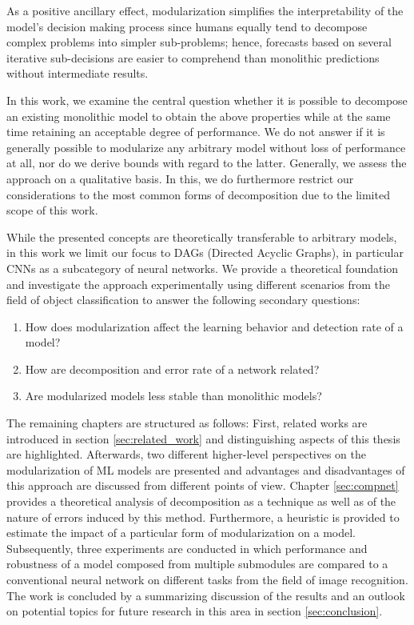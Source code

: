 As a positive ancillary effect, modularization simplifies the interpretability of the model's decision making process since humans equally tend to decompose complex problems into simpler sub-problems; hence, forecasts based on several iterative sub-decisions are easier to comprehend than monolithic predictions without intermediate results.

In this work, we examine the central question whether it is possible to decompose an existing monolithic model to obtain the above properties while at the same time retaining an acceptable degree of performance. We do not answer if it is generally possible to modularize any arbitrary model without loss of performance at all, nor do we derive bounds with regard to the latter. Generally, we assess the approach on a qualitative basis. In this, we do furthermore restrict our considerations to the most common forms of decomposition due to the limited scope of this work.

While the presented concepts are theoretically transferable to arbitrary models, in this work we limit our focus to DAGs (Directed Acyclic Graphs), in particular CNNs as a subcategory of neural networks. We provide a theoretical foundation and investigate the approach experimentally using different scenarios from the field of object classification to answer the following secondary questions:

\pagebreak

\begin{enumerate}
    \item How does modularization affect the learning behavior and detection rate of a model?
    \item How are decomposition and error rate of a network related?
    \item Are modularized models less stable than monolithic models?
\end{enumerate}

The remaining chapters are structured as follows: First, related works are introduced in section \ref{sec:related_work} and distinguishing aspects of this thesis are highlighted. Afterwards, two different higher-level perspectives on the modularization of ML models are presented and advantages and disadvantages of this approach are discussed from different points of view. Chapter \ref{sec:compnet} provides a theoretical analysis of decomposition as a technique as well as of the nature of errors induced by this method. Furthermore, a heuristic is provided to estimate the impact of a particular form of modularization on a model. Subsequently, three experiments are conducted in which performance and robustness of a model composed from multiple submodules are compared to a conventional neural network on different tasks from the field of image recognition. The work is concluded by a summarizing discussion of the results and an outlook on potential topics for future research in this area in section \ref{sec:conclusion}.


